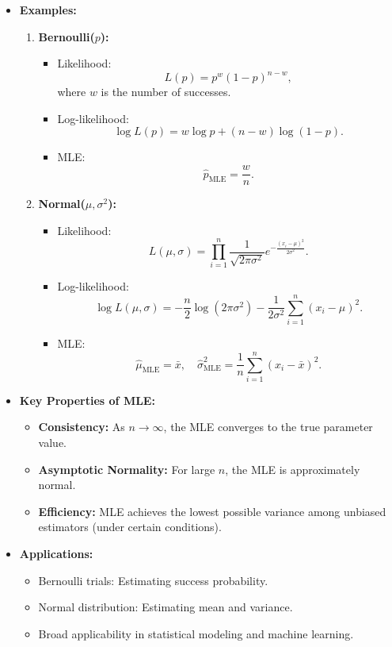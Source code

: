 \documentclass{article}
\begin{document}
\begin{itemize}
  \item \textbf{Examples:}
    \begin{enumerate}
      \item \textbf{Bernoulli($p$):}
        \begin{itemize}
          \item Likelihood:
            \[
              L(p) = p^w (1-p)^{n-w},
            \]
            where $w$ is the number of successes.
          \item Log-likelihood:
            \[
              \log L(p) = w \log p + (n-w) \log (1-p).
            \]
          \item MLE:
            \[
              \hat{p}_{\text{MLE}} = \frac{w}{n}.
            \]
        \end{itemize}

      \item \textbf{Normal($\mu, \sigma^2$):}
        \begin{itemize}
          \item Likelihood:
            \[
              L(\mu, \sigma) = \prod_{i=1}^n \frac{1}{\sqrt{2\pi\sigma^2}} e^{-\frac{(x_i-\mu)^2}{2\sigma^2}}.
            \]
          \item Log-likelihood:
            \[
              \log L(\mu, \sigma) = -\frac{n}{2} \log (2\pi\sigma^2) - \frac{1}{2\sigma^2} \sum_{i=1}^n (x_i - \mu)^2.
            \]
          \item MLE:
            \[
              \hat{\mu}_{\text{MLE}} = \bar{x}, \quad \hat{\sigma}^2_{\text{MLE}} = \frac{1}{n} \sum_{i=1}^n (x_i - \bar{x})^2.
            \]
        \end{itemize}
    \end{enumerate}

  \item \textbf{Key Properties of MLE:}
    \begin{itemize}
      \item \textbf{Consistency:} As $n \to \infty$, the MLE converges to the true parameter value.
      \item \textbf{Asymptotic Normality:} For large $n$, the MLE is approximately normal.
      \item \textbf{Efficiency:} MLE achieves the lowest possible variance among unbiased estimators (under certain conditions).
    \end{itemize}

  \item \textbf{Applications:}
    \begin{itemize}
      \item Bernoulli trials: Estimating success probability.
      \item Normal distribution: Estimating mean and variance.
      \item Broad applicability in statistical modeling and machine learning.
    \end{itemize}
\end{itemize}
\end{document}
